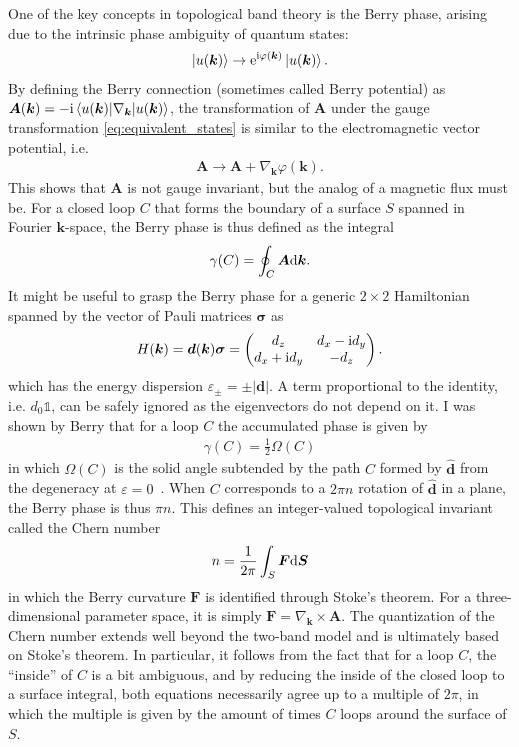 One of the key concepts in topological band theory is the Berry phase, arising due to the intrinsic phase ambiguity of quantum states:
\begin{align}
    \ket{u(\bm k)}\rightarrow \mathrm e^{\mathrm i \varphi(\bm k)}\ket{u(\bm k)}.
    \label{eq:equivalent_states}
\end{align}
By defining the Berry connection (sometimes called Berry potential) as $\bm A(\bm k) = -\mathrm i \braket{u(\bm k)|\nabla_{\bm k}|u(\bm k)}$, the transformation of $\bm A$ under the gauge transformation \cref{eq:equivalent_states} is similar to the electromagnetic vector potential, i.e.
\begin{align}
    \bm A \rightarrow {\bm A} + \nabla_{\bm k}\varphi(\bm k).
\end{align}
This shows that $\bm A$ is not gauge invariant, but the analog of a magnetic flux must be.
For a closed loop $C$ that forms the boundary of a surface $S$ spanned in Fourier $\bm k$-space, the Berry phase is thus defined as the integral
\begin{align}
    \gamma(C) = \oint_C{\bm A}\mathrm d \bm k.
\end{align}
It might be useful to grasp the Berry phase for a generic $2\times 2$ Hamiltonian spanned by the vector of Pauli matrices $\bm\sigma$ as
\begin{align}
    H(\bm k) = \bm d(\bm k) \bm\sigma =
    \begin{pmatrix}
        d_z & d_x - \mathrm i d_y \\
        d_x + \mathrm i d_y & -d_z
    \end{pmatrix}.
\end{align}
which has the energy dispersion $\varepsilon_\pm = \pm |\bm d|$.
A term proportional to the identity, i.e. $d_0\mathbb 1$, can be safely ignored as the eigenvectors do not depend on it.
I was shown by Berry that for a loop $C$ the accumulated phase is given by
\begin{align}
    \gamma(C) = \frac12\Omega(C)
\end{align}
in which $\Omega(C)$ is the solid angle subtended by the path $C$ formed by $\hat {\bm d}$ from the degeneracy at $\varepsilon=0$~\cite{Berry1984}.
When $C$ corresponds to a $2\pi n$ rotation of $\hat{\bm d}$ in a plane, the Berry phase is thus $\pi n$.
This defines an integer-valued topological invariant called the Chern number~\cite{Nakahara1990}
\begin{align}
    n = \frac1{2\pi}\int_S {\bm F} \mathrm d{\bm S}
\end{align}
in which the Berry curvature ${\bm F}$ is identified through Stoke's theorem.
For a three-dimensional parameter space, it is simply $\bm F = \nabla_{\bm k}\times{\bm A}$.
The quantization of the Chern number extends well beyond the two-band model and is ultimately based on Stoke's theorem.
In particular, it follows from the fact that for a loop $C$, the ``inside'' of $C$ is a bit ambiguous, and by reducing the inside of the closed loop to a surface integral, both equations necessarily agree up to a multiple of $2\pi$, in which the multiple is given by the amount of times $C$ loops around the surface of $S$.
%
%
